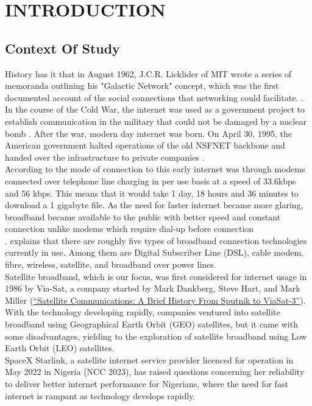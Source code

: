 \chapter{INTRODUCTION}
\section{Context Of Study}
History has it that in August 1962, J.C.R. Licklider of MIT wrote a series of memoranda outlining his "Galactic Network" concept, which was the first documented account of the social connections that networking could facilitate. \cite{leinerbrief}. In the course of the Cold War, the internet was used as a government project to establish communication in the military that could not be damaged by a nuclear bomb \cite{abbate2000inventing}. After the war, modern day internet was born. On April 30, 1995, the American government halted operations of the old NSFNET backbone and handed over the infrastructure to private companies \cite{abbate2000inventing}.\\
	According to \cite{mack2020history} the mode of connection to this early internet was through modems connected over telephone line charging in per use basis at a speed of 33.6kbps and 56 kbps. This means that it would take 1 day, 18 hours and 36 minutes to download a 1 gigabyte file. As the need for faster internet became more glaring, broadband became available to the public with better speed and constant connection unlike modems which require dial-up before connection\\.
	\cite{moeyaert2011network} explains that there are roughly five types of broadband connection technologies currently in use. Among them are Digital Subscriber Line (DSL), cable modem, fibre, wireless, satellite, and broadband over power lines.\\
	Satellite broadband, which is our focus, was first considered for internet usage in 1986 by Via-Sat, a company started by Mark Dankberg, Steve Hart, and Mark Miller (\href{https://news.viasat.com/blog/scn/satellite-communications-a-brief-history-from-sputnik-to-viasat-3}{``Satellite Communications: A Brief History From Sputnik to ViaSat-3''}). With the technology developing rapidly, companies ventured into satellite broadband using Geographical Earth Orbit (GEO) satellites, but it came with some disadvantages, yielding to the exploration of satellite broadband using Low Earth Orbit (LEO) satellites.\\
	SpaceX Starlink, a satellite internet service provider licenced for operation in May 2022 in Nigeria (NCC 2023), has raised questions concerning her reliability to deliver better internet performance for Nigerians, where the need for fast internet is rampant as technology develops rapidly.
